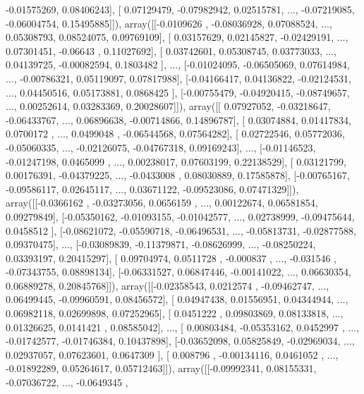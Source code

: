 \documentclass{article}
\begin{document}
        -0.01575269,  0.08406243],
       [ 0.07129479, -0.07982942,  0.02515781, ..., -0.07219085,
        -0.06004754,  0.15495885]]), array([[-0.0109626 , -0.08036928,  0.07088524, ...,  0.05308793,
         0.08524075,  0.09769109],
       [ 0.03157629,  0.02145827, -0.02429191, ...,  0.07301451,
        -0.06643   ,  0.11027692],
       [ 0.03742601,  0.05308745,  0.03773033, ...,  0.04139725,
        -0.00082594,  0.1803482 ],
       ..., 
       [-0.01024095, -0.06505069,  0.07614984, ..., -0.00786321,
         0.05119097,  0.07817988],
       [-0.04166417,  0.04136822, -0.02124531, ...,  0.04450516,
         0.05173881,  0.0868425 ],
       [-0.00755479, -0.04920415, -0.08749657, ...,  0.00252614,
         0.03283369,  0.20028607]]), array([[ 0.07927052, -0.03218647, -0.06433767, ...,  0.06896638,
        -0.00714866,  0.14896787],
       [ 0.03074884,  0.01417834,  0.0700172 , ...,  0.0499048 ,
        -0.06544568,  0.07564282],
       [ 0.02722546,  0.05772036, -0.05060335, ..., -0.02126075,
        -0.04767318,  0.09169243],
       ..., 
       [-0.01146523, -0.01247198,  0.0465099 , ...,  0.00238017,
         0.07603199,  0.22138529],
       [ 0.03121799,  0.00176391, -0.04379225, ..., -0.0433008 ,
         0.08030889,  0.17585878],
       [-0.00765167, -0.09586117,  0.02645117, ...,  0.03671122,
        -0.09523086,  0.07471329]]), array([[-0.0366162 , -0.03273056,  0.0656159 , ...,  0.00122674,
         0.06581854,  0.09279849],
       [-0.05350162, -0.01093155, -0.01042577, ...,  0.02738999,
        -0.09475644,  0.0458512 ],
       [-0.08621072, -0.05590718, -0.06496531, ..., -0.05813731,
        -0.02877588,  0.09370475],
       ..., 
       [-0.03089839, -0.11379871, -0.08626999, ..., -0.08250224,
         0.03393197,  0.20415297],
       [ 0.09704974,  0.0511728 , -0.000837  , ..., -0.031546  ,
        -0.07343755,  0.08898134],
       [-0.06331527,  0.06847446, -0.00141022, ...,  0.06630354,
         0.06889278,  0.20845768]]), array([[-0.02358543,  0.0212574 , -0.09462747, ...,  0.06499445,
        -0.09960591,  0.08456572],
       [ 0.04947438,  0.01556951,  0.04344944, ...,  0.06982118,
         0.02699898,  0.07252965],
       [ 0.0451222 ,  0.09803869,  0.08133818, ...,  0.01326625,
         0.0141421 ,  0.08585042],
       ..., 
       [ 0.00803484, -0.05353162,  0.0452997 , ..., -0.01742577,
        -0.01746384,  0.10437898],
       [-0.03652098,  0.05825849, -0.02969034, ...,  0.02937057,
         0.07623601,  0.0647309 ],
       [ 0.008796  , -0.00134116,  0.0461052 , ..., -0.01892289,
         0.05264617,  0.05712463]]), array([[-0.09992341,  0.08155331, -0.07036722, ..., -0.0649345 ,
\end{document}
